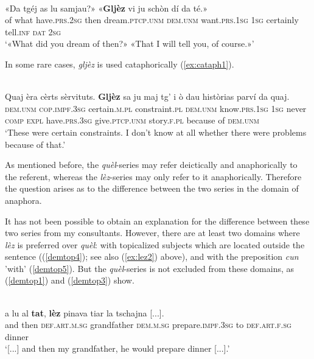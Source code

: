 \ea
\label{ex:lez8}
\\
\gll «Da tgéj as lu samjau?» «\textbf{Gljèz} vi ju schòn dí da té.»\\
     of what have.\textsc{prs.2sg} then dream.\textsc{ptcp.unm} \textsc{dem.unm} want.\textsc{prs.1sg} \textsc{1sg} 
 certainly tell.\textsc{inf} \textsc{dat} \textsc{2sg}\\
\glt `«What did you dream of then?» «That I will tell you, of course.»'
\z

In some rare cases, \textit{gljèz} is used cataphorically (\ref{ex:cataph1}).

\ea\label{ex:cataph1}
\\
\gll  Quaj èra cèrts sèrvituts. \textbf{Gljèz} sa ju maj tg’ i ò dau històrias parví da quaj. \\
    \textsc{dem.unm} \textsc{cop.impf.3sg} certain.\textsc{m.pl} constraint.\textsc{pl} \textsc{dem.unm}  know.\textsc{prs.1sg} \textsc{1sg} never \textsc{comp} \textsc{expl} have.\textsc{prs.3sg} give.\textsc{ptcp.unm} story.\textsc{f.pl} because of \textsc{dem.unm} \\
\glt `These were certain constraints. I don’t know at all whether there were problems because of that.'
\z

As mentioned before, the \textit{quèl}-series may refer deictically and anaphorically to the referent, whereas the \textit{lèz}-series may only refer to it anaphorically. Therefore the question arises as to the difference between the two series in the domain of anaphora.

It has not been possible to obtain an explanation for the difference between these two series from my consultants. However, there are at least two domains where \textit{lèz} is preferred over \textit{quèl}: with topicalized subjects which are located outside the sentence ((\ref{demtop4}); see also (\ref{ex:lez2}) above), and with the preposition \textit{cun} 'with' (\ref{demtop5}). But the \textit{quèl}-series is not excluded from these domains, as (\ref{demtop1}) and (\ref{demtop3}) show.

\ea
\label{demtop4}
\\
\gll [...] a lu al \textbf{tat}, \textbf{lèz} pinava tiar la tschajna [...].  \\
  {} and then \textsc{def.art.m.sg} grandfather \textsc{dem.m.sg} prepare.\textsc{impf.3sg} to \textsc{def.art.f.sg} dinner  \\
\glt `[...] and then my grandfather, he would prepare dinner [...].'
\z

